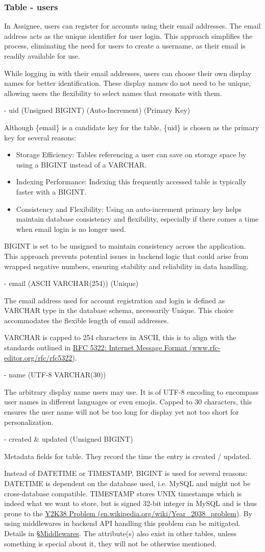 \documentclass[12pt]{report}
\newcommand{\n}{\par}
\newcommand{\br}{\n\vspace{1 em}\n}
\begin{document}
\subsubsection{Table - users} \label{data-layer.design.user-system.users}
In Assignee, users can register for accounts using their email addresses.
The email address acts as the unique identifier for user login.
This approach simplifies the process, eliminating the need for users to create a username,
as their email is readily available for use.\n
While logging in with their email addresses, users can choose their own display names for better identification.
These display names do not need to be unique, allowing users the flexibility to select names that resonate with them.
\br
- uid (Unsigned BIGINT) (Auto-Increment) (Primary Key)\n
Although \{email\} is a candidate key for the table, \{uid\} is chosen as the primary key for several reasons:\n
\begin{itemize}
	\item Storage Efficiency: Tables referencing a user can save on storage space by using a BIGINT instead of a VARCHAR.
	\item Indexing Performance: Indexing this frequently accessed table is typically faster with a BIGINT.
	\item Consistency and Flexibility: Using an auto-increment primary key helps maintain database consistency and flexibility, especially if there comes a time when email login is no longer used.
\end{itemize}\n
BIGINT is set to be unsigned to maintain consistency across the application.
This approach prevents potential issues in backend logic that could arise from wrapped negative numbers,
ensuring stability and reliability in data handling.
\br
- email (ASCII VARCHAR(254)) (Unique)\n
The email address used for account registration and login is defined as VARCHAR type in the database schema, necessarily Unique.
This choice accommodates the flexible length of email addresses.\n
VARCHAR is capped to 254 characters in ASCII, this is to align with the standards outlined in
\href{https://www.rfc-editor.org/rfc/rfc5322}{RFC 5322: Internet Message Format (www.rfc-editor.org/rfc/rfc5322)}.
\br
- name (UTF-8 VARCHAR(30))\n
The arbitrary display name users may use.
It is of UTF-8 encoding to encompass user names in different languages or even emojis.
Capped to 30 characters, this ensures the user name will not be too long for display yet not too short for personalization.
\br
- created \& updated (Unsigned BIGINT)\n
Metadata fields for table. They record the time the entry is created / updated.\n
Instead of DATETIME or TIMESTAMP, BIGINT is used for several reasons:
DATETIME is dependent on the database used, i.e. MySQL and might not be cross-database compatible.
TIMESTAMP stores UNIX timestamps which is indeed what we want to store,
but is signed 32-bit integer in MySQL and is thus prone to the \href{https://en.wikipedia.org/wiki/Year_2038_problem}{Y2K38 Problem (en.wikipedia.org\-/wiki/Year\_2038\_problem)}.
By using middlewares in backend API handling this problem can be mitigated.
Details in \S \hyperref[application-layer.design.middlewares]{Middlewares}.
The attribute(s) also exist in other tables, unless something is special about it, they will not be otherwise mentioned.
\end{document}
